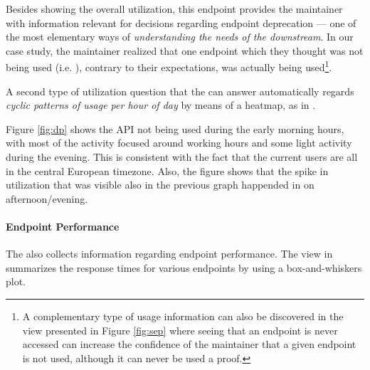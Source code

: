 \documentclass{sig-alternate-05-2015}
\begin{document}
Besides showing the overall utilization, this endpoint provides the maintainer with information relevant for decisions regarding endpoint deprecation --- one of the most elementary ways of {\em understanding the needs of the downstream}\cite{Haen14a}. In our case study, the maintainer realized that one endpoint which they thought was not being used (i.e. ), contrary to their expectations, was actually being used\footnote{A complementary type of usage information can also be discovered in the view presented in Figure \ref{fig:sep} where seeing that an endpoint is never accessed can increase the confidence of the maintainer that a given endpoint is not used, although it can never be used a proof.}.

\niceseparator


A second type of utilization question that the \tool can answer automatically regards {\em cyclic patterns of usage per hour of day} by means of a heatmap, as in . 




Figure \ref{fig:dp} shows the API not being used during the early morning hours, with most of the activity focused around working hours and some light activity during the evening. This is consistent with the fact that the current users are all in the central European timezone. Also, the figure shows that the spike in utilization that was visible also in the previous graph happended in on afternoon/evening.

\paragraph{Endpoint Performance}
\label{sec:perf}

  The \tool also collects information regarding endpoint performance. The view in  summarizes the response times for various endpoints by using a box-and-whiskers plot. 
\end{document}
